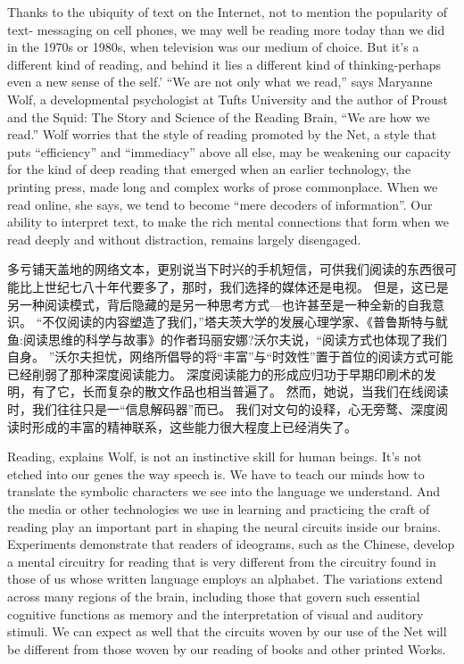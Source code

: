 \documentclass[cs4size, a4paper, 12pt]{article}
\newcounter{numpar}
\newcommand*{\newpar}{\numpar{}}
\begin{document}
	\newpar Thanks to the ubiquity of text on the Internet, not to mention the popularity of text- messaging on cell phones, we may well be reading more today than we did in the 1970s or 1980s, when television was our medium of choice. But it's a different kind of reading, and behind it lies a different kind of thinking-perhaps even a new sense of the self.' ``We are not only what we read,'' says Maryanne Wolf, a developmental psychologist at Tufts University and the author of Proust and the Squid: The Story and Science of the Reading Brain, ``We are how we read.'' Wolf worries that the style of reading promoted by the Net, a style that puts ``efficiency'' and ``immediacy'' above all else, may be weakening our capacity for the kind of deep reading that emerged when an earlier technology, the printing press, made long and complex works of prose commonplace. When we read online, she says, we tend to become ``mere decoders of information''. Our ability to interpret text, to make the rich mental connections that form when we read deeply and without distraction, remains largely disengaged.
	
	多亏铺天盖地的网络文本，更别说当下时兴的手机短信，可供我们阅读的东西很可能比上世纪七八十年代要多了，那时，我们选择的媒体还是电视。 但是，这已是另一种阅读模式，背后隐藏的是另一种思考方式—也许甚至是一种全新的自我意识。 ``不仅阅读的内容塑造了我们，''塔夫茨大学的发展心理学家、《普鲁斯特与鱿鱼:阅读思维的科学与故事》的作者玛丽安娜?沃尔夫说，``阅读方式也体现了我们自身。 ''沃尔夫担忧，网络所倡导的将``丰富''与``时效性''置于首位的阅读方式可能已经削弱了那种深度阅读能力。 深度阅读能力的形成应归功于早期印刷术的发明，有了它，长而复杂的散文作品也相当普遍了。 然而，她说，当我们在线阅读时，我们往往只是一``信息解码器''而已。 我们对文句的设释，心无旁鹜、深度阅读时形成的丰富的精神联系，这些能力很大程度上已经消失了。 
	
	\newpar Reading, explains Wolf, is not an instinctive skill for human beings. It's not etched into our genes the way speech is. We have to teach our minds how to translate the symbolic characters we see into the language we understand. And the media or other technologies we use in learning and practicing the craft of reading play an important part in shaping the neural circuits inside our brains. Experiments demonstrate that readers of ideograms, such as the Chinese, develop a mental circuitry for reading that is very different from the circuitry found in those of us whose written language employs an alphabet. The variations extend across many regions of the brain, including those that govern such essential cognitive functions as memory and the interpretation of visual and auditory stimuli. We can expect as well that the circuits woven by our use of the Net will be different from those woven by our reading of books and other printed Works.
	
\end{document}
